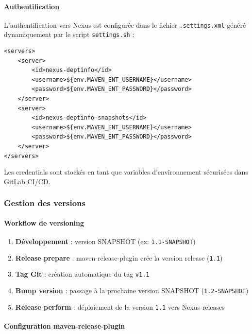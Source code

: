 \paragraph{Authentification}

L'authentification vers Nexus est configurée dans le fichier \texttt{.settings.xml} généré dynamiquement par le script \texttt{settings.sh} :

\begin{lstlisting}[language=enhancedxml, caption=Authentification Nexus]
<servers>
    <server>
        <id>nexus-deptinfo</id>
        <username>${env.MAVEN_ENT_USERNAME}</username>
        <password>${env.MAVEN_ENT_PASSWORD}</password>
    </server>
    <server>
        <id>nexus-deptinfo-snapshots</id>
        <username>${env.MAVEN_ENT_USERNAME}</username>
        <password>${env.MAVEN_ENT_PASSWORD}</password>
    </server>
</servers>
\end{lstlisting}

Les credentials sont stockés en tant que variables d'environnement sécurisées dans GitLab CI/CD.

\subsubsection{Gestion des versions}

\paragraph{Workflow de versioning}

\begin{enumerate}
    \item \textbf{Développement} : version SNAPSHOT (ex: \texttt{1.1-SNAPSHOT})
    \item \textbf{Release prepare} : maven-release-plugin crée la version release (\texttt{1.1})
    \item \textbf{Tag Git} : création automatique du tag \texttt{v1.1}
    \item \textbf{Bump version} : passage à la prochaine version SNAPSHOT (\texttt{1.2-SNAPSHOT})
    \item \textbf{Release perform} : déploiement de la version \texttt{1.1} vers Nexus releases
\end{enumerate}

\paragraph{Configuration maven-release-plugin}

